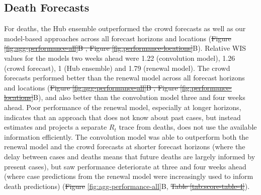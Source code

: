 \documentclass[10pt,letterpaper]{article}
\providecommand{\DIFaddtex}[1]{{\protect\color{blue}\uwave{#1}}} %
\providecommand{\DIFdeltex}[1]{{\protect\color{red}\sout{#1}}}                      %
\providecommand{\DIFaddbegin}{} %
\providecommand{\DIFaddend}{} %
\providecommand{\DIFdelbegin}{} %
\providecommand{\DIFdelend}{} %
\providecommand{\DIFadd}[1]{\texorpdfstring{\DIFaddtex{#1}}{#1}} %
\providecommand{\DIFdel}[1]{\texorpdfstring{\DIFdeltex{#1}}{}} %
\newcommand{\DIFscaledelfig}{0.5}
\newlength{\DIFdelgraphicswidth} %
\newlength{\DIFdelgraphicsheight} %
\newcommand{\DIFaddincludegraphics}[2][]{{\color{blue}\fbox{\DIFOincludegraphics[#1]{#2}}}} %
\newcommand{\DIFdelincludegraphics}[2][]{%
\sbox{\DIFdelgraphicsbox}{\DIFOincludegraphics[#1]{#2}}%
\settoboxwidth{\DIFdelgraphicswidth}{\DIFdelgraphicsbox} %
\settoboxtotalheight{\DIFdelgraphicsheight}{\DIFdelgraphicsbox} %
\scalebox{\DIFscaledelfig}{%
\parbox[b]{\DIFdelgraphicswidth}{\usebox{\DIFdelgraphicsbox}\\[-\baselineskip] \rule{\DIFdelgraphicswidth}{0em}}\llap{\resizebox{\DIFdelgraphicswidth}{\DIFdelgraphicsheight}{%
\setlength{\unitlength}{\DIFdelgraphicswidth}%
\begin{picture}(1,1)%
\thicklines\linethickness{2pt} %
{\color[rgb]{1,0,0}\put(0,0){\framebox(1,1){}}}%
{\color[rgb]{1,0,0}\put(0,0){\line( 1,1){1}}}%
{\color[rgb]{1,0,0}\put(0,1){\line(1,-1){1}}}%
\end{picture}%
}\hspace*{3pt}}} %
} %
\DeclareRobustCommand{\DIFaddbegin}{\DIFOaddbegin \let\includegraphics\DIFaddincludegraphics} %
\DeclareRobustCommand{\DIFaddend}{\DIFOaddend \let\includegraphics\DIFOincludegraphics} %
\DeclareRobustCommand{\DIFdelbegin}{\DIFOdelbegin \let\includegraphics\DIFdelincludegraphics} %
\DeclareRobustCommand{\DIFdelend}{\DIFOaddend \let\includegraphics\DIFOincludegraphics} %
\begin{document}
\hypertarget{death-forecasts}{%
\subsection{Death Forecasts}\label{death-forecasts}}

For deaths, the Hub ensemble outperformed the crowd forecasts as well as
our model-based approaches across all forecast horizons and locations
(\DIFdelbegin \DIFdel{Figure \ref{fig:agg-performance-all}B , Figure
\ref{fig:performance-locations}}\DIFdelend \DIFaddbegin \DIFadd{Figs \ref{fig:agg-performance-all}B and
}\DIFaddend B). Relative WIS values for the
models two weeks ahead were 1.22 (convolution model), 1.26 (crowd
forecast), 1 (Hub ensemble) and 1.79 (renewal model). The crowd
forecasts performed better than the renewal model across all forecast
horizons and locations (\DIFdelbegin \DIFdel{Figure \ref{fig:agg-performance-all}B , Figure
\ref{fig:performance-locations}}\DIFdelend \DIFaddbegin \DIFadd{Figs \ref{fig:agg-performance-all}B and
}\DIFaddend B), and also better than the
convolution model three and four weeks ahead. Poor performance of the
renewal model, especially at longer horizons, indicates that an approach
that does not know about past cases, but instead estimates and projects
a separate \(R_t\) trace from deaths, does not use the available
information efficiently. The convolution model was able to outperform
both the renewal model and the crowd forecasts at shorter forecast
horizons (where the delay between cases and deaths means that future
deaths are largely informed by present cases), but saw performance
deteriorate at three and four weeks ahead (where case predictions from
the renewal model were increasingly used to inform death predictions)
(\DIFdelbegin \DIFdel{Figure
}\DIFdelend \DIFaddbegin \DIFadd{Fig }\DIFaddend \ref{fig:agg-performance-all}B, \DIFdelbegin \DIFdel{Table \ref{tab:score-table-4}}\DIFdelend \DIFaddbegin {}\DIFaddend ).
\end{document}
